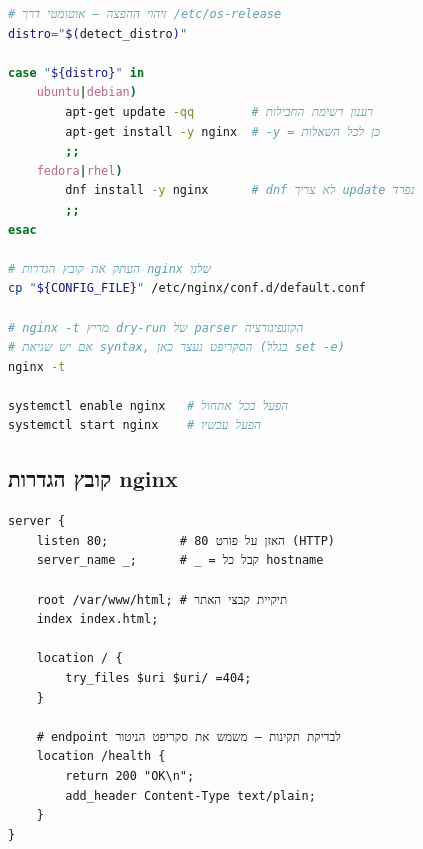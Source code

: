 \documentclass[12pt,a4paper]{article}
\begin{document}
\begin{center}
\end{center}

\begin{lstlisting}[language=bash, caption={install\_nginx.sh — התקנה והפעלה}]
# זיהוי ההפצה — אוטומטי דרך /etc/os-release
distro="$(detect_distro)"

case "${distro}" in
    ubuntu|debian)
        apt-get update -qq        # רענון רשימת החבילות
        apt-get install -y nginx  # -y = כן לכל השאלות
        ;;
    fedora|rhel)
        dnf install -y nginx      # dnf לא צריך update נפרד
        ;;
esac

# העתק את קובץ הגדרות nginx שלנו
cp "${CONFIG_FILE}" /etc/nginx/conf.d/default.conf

# nginx -t מריץ dry-run של parser הקונפיגורציה
# אם יש שגיאת syntax, הסקריפט נעצר כאן (בגלל set -e)
nginx -t

systemctl enable nginx   # הפעל בכל אתחול
systemctl start nginx    # הפעל עכשיו
\end{lstlisting}

\subsection{קובץ הגדרות nginx}

\begin{lstlisting}[caption={config/nginx/default.conf}]
server {
    listen 80;          # האזן על פורט 80 (HTTP)
    server_name _;      # _ = קבל כל hostname

    root /var/www/html; # תיקיית קבצי האתר
    index index.html;

    location / {
        try_files $uri $uri/ =404;
    }

    # endpoint לבדיקת תקינות — משמש את סקריפט הניטור
    location /health {
        return 200 "OK\n";
        add_header Content-Type text/plain;
    }
}
\end{lstlisting}
\end{document}
